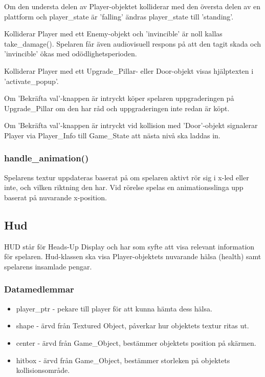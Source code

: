 \documentclass{TDP005mall}
\begin{document}
Om den understa delen av Player-objektet kolliderar med den översta delen av en plattform och player\_state är 'falling' ändras player\_state till 'standing'.

Kolliderar Player med ett Enemy-objekt och 'invincible' är noll kallas take\_damage(). Spelaren får även audiovisuell respons på att den tagit skada och 'invincible' ökas med odödlighetsperioden.

Kolliderar Player med ett Upgrade\_Pillar- eller  Door-objekt visas hjälptexten i 'activate\_popup'.

Om 'Bekräfta val'-knappen är intryckt köper spelaren uppgraderingen på Upgrade\_Pillar om den har råd och uppgraderingen inte redan är köpt. 

Om 'Bekräfta val'-knappen är intryckt vid kollision med 'Door'-objekt signalerar Player via Player\_Info till Game\_State att nästa nivå ska laddas in.

\subsubsection{handle\_animation()}
Spelarens textur uppdateras baserat på om spelaren aktivt rör sig i x-led eller inte, och vilken riktning den har. Vid rörelse spelas en animationsslinga upp baserat på nuvarande x-position.

\subsection{Hud}
HUD står för Heads-Up Display och har som syfte att visa relevant information för spelaren. 
Hud-klassen ska visa Player-objektets nuvarande hälsa (health) samt spelarens insamlade pengar.

\subsubsection{Datamedlemmar}
\begin{itemize}
\item player\_ptr - pekare till player för att kunna hämta dess hälsa.
\item shape - ärvd från Textured Object, påverkar hur objektets textur ritas ut.
\item center - ärvd från Game\_Object, bestämmer objektets position på skärmen.
\item hitbox - ärvd från Game\_Object, bestämmer storleken på objektets kollisionsområde.
\end{itemize}
\end{document}

